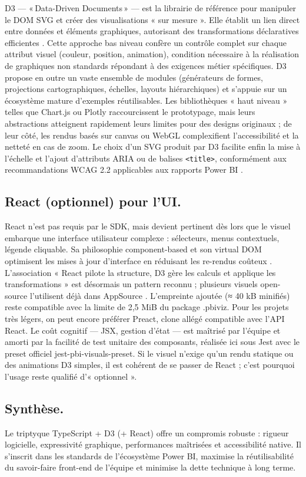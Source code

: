 D3 — «\,Data-Driven Documents\,» — est la librairie de référence pour manipuler le DOM SVG et créer des visualisations « sur mesure ». 
Elle établit un lien direct entre données et éléments graphiques, autorisant des transformations déclaratives efficientes \parencite{Bostock2019}. 
Cette approche bas niveau confère un contrôle complet sur chaque attribut visuel (couleur, position, animation), condition nécessaire à la réalisation de graphiques non standards répondant à des exigences métier spécifiques. 
D3 propose en outre un vaste ensemble de modules (générateurs de formes, projections cartographiques, échelles, layouts hiérarchiques) et s’appuie sur un écosystème mature d’exemples réutilisables. 
Les bibliothèques « haut niveau » telles que Chart.js ou Plotly raccourcissent le prototypage, mais leurs abstractions atteignent rapidement leurs limites pour des designs originaux ; de leur côté, les rendus basés sur canvas ou WebGL complexifient l’accessibilité et la netteté en cas de zoom. Le choix d’un SVG produit par D3 facilite enfin la mise à l’échelle et l’ajout d’attributs ARIA ou de balises \verb|<title>|, conformément aux recommandations WCAG 2.2 applicables aux rapports Power BI \parencite{W3CAccessibility2023}.


\subsection{React (optionnel) pour l’UI.}
React n’est pas requis par le SDK, mais devient pertinent dès lors que le
visuel embarque une interface utilisateur complexe : sélecteurs, menus
contextuels, légende cliquable. Sa philosophie component-based et
son virtual DOM optimisent les mises à jour d’interface en
réduisant les re-rendus coûteux \parencite{ReactDocs2024}. L’association
« React pilote la structure, D3 gère les calculs et applique les
transformations » est désormais un pattern reconnu ; plusieurs
visuels open-source l’utilisent déjà dans AppSource
\parencite{PowerBIReactD3Sample2024}. L’empreinte ajoutée (≈ 40 kB
minifiés) reste compatible avec la limite de 2,5 MiB du package .pbiviz.
Pour les projets très légers, on peut encore préférer Preact, clone
allégé compatible avec l’API React. Le coût cognitif — JSX, gestion d’état —
est maîtrisé par l’équipe et amorti par la facilité de test unitaire des
composants, réalisée ici sous Jest avec le preset officiel
jest-pbi-visuals-preset. Si le visuel n’exige qu’un rendu statique
ou des animations D3 simples, il est cohérent de se passer de React ; c’est
pourquoi l’usage reste qualifié d’« optionnel ».

\subsection{Synthèse.}
Le triptyque TypeScript + D3 (+ React) offre un compromis robuste :
rigueur logicielle, expressivité graphique, performances maîtrisées et
accessibilité native. Il s’inscrit dans les standards de l’écosystème
Power BI, maximise la réutilisabilité du savoir-faire front-end de l’équipe
et minimise la dette technique à long terme.
